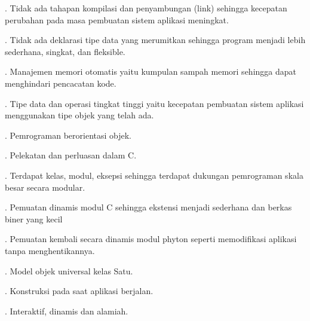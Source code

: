 {{{{{{{{{\noindent 
{\fontsize{14pt}{14pt}. Tidak ada tahapan kompilasi dan penyambungan (link) sehingga kecepatan perubahan pada masa pembuatan sistem aplikasi meningkat. \\} \par
\vspace{14pt}
\noindent 
{\fontsize{14pt}{14pt}. Tidak ada deklarasi tipe data yang merumitkan sehingga program menjadi lebih sederhana, singkat, dan fleksible. \\} \par
\vspace{14pt}
\noindent 
{\fontsize{14pt}{14pt}. Manajemen memori otomatis yaitu kumpulan sampah memori sehingga dapat menghindari pencacatan kode. \\} \par
\noindent 
{\fontsize{14pt}{14pt}. Tipe data dan operasi tingkat tinggi yaitu kecepatan pembuatan sistem aplikasi menggunakan tipe objek yang telah ada. \\} \par
\noindent 
{\fontsize{14pt}{14pt}. Pemrograman berorientasi objek. \\} \par
\noindent 
{\fontsize{14pt}{14pt}. Pelekatan dan perluasan dalam C. \\} \par
\noindent 
{\fontsize{14pt}{14pt}. Terdapat kelas, modul, eksepsi sehingga terdapat dukungan pemrograman skala besar secara modular. \\} \par
\noindent 
{\fontsize{14pt}{14pt}. Pemuatan dinamis modul C sehingga ekstensi menjadi sederhana dan berkas biner yang kecil \\} \par
\noindent 
{\fontsize{14pt}{14pt}. Pemuatan kembali secara dinamis modul phyton seperti memodifikasi aplikasi tanpa menghentikannya. \\} \par
\noindent 
{\fontsize{14pt}{14pt}. Model objek universal kelas Satu. \\} \par
\noindent 
{\fontsize{14pt}{14pt}. Konstruksi pada saat aplikasi berjalan. \\} \par
\noindent 
{\fontsize{14pt}{14pt}. Interaktif, dinamis dan alamiah. \\} \par
}}}}}}}}}
